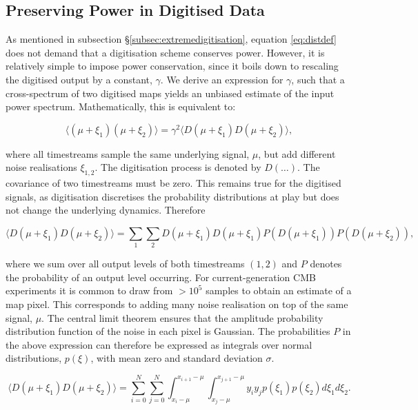 \documentclass[apj]{emulateapj}
\begin{document}
\subsection{Preserving Power in Digitised Data}
\label{subsec:appendixpreservepower}

As mentioned in subsection \S\ref{subsec:extremedigitisation}, equation \ref{eq:distdef} does not demand that a digitisation scheme conserves power. However, it is relatively simple to impose power conservation, since it boils down to rescaling the digitised output by a constant, $\gamma$. We derive an expression for $\gamma$, such that a cross-spectrum of two digitised maps yields an unbiased estimate of the input power spectrum. Mathematically, this is equivalent to:

\begin{equation} \label{eq:normcrosspower}
\langle (\mu + \xi_1) (\mu + \xi_2) \rangle = \gamma^2 \langle D(\mu + \xi_1) D(\mu + \xi_2) \rangle,
\end{equation}

where all timestreams sample the same underlying signal, $\mu$, but add different noise realisations $\xi_{1, 2}$. The digitisation process is denoted by $D(\dots)$. The covariance of two timestreams must be zero. This remains true for the digitised signals, as digitisation discretises the probability distributions at play but does not change the underlying dynamics. Therefore

\begin{equation}
\langle D(\mu + \xi_1) D(\mu + \xi_2) \rangle = \sum_1 \sum_2 D(\mu + \xi_1) D(\mu + \xi_1) P(D(\mu + \xi_1)) P(D(\mu + \xi_2)),
\end{equation}

where we sum over all output levels of both timestreams $(1, 2)$ and $P$ denotes the probability of an output level occurring. For current-generation CMB experiments it is common to draw from $>10^5$ samples to obtain an estimate of a map pixel. This corresponds to adding many noise realisation on top of the same signal, $\mu$. 
The central limit theorem ensures that the amplitude probability distribution function of the noise in each pixel is Gaussian. 
The probabilities $P$ in the above expression can therefore be expressed as integrals over normal distributions, $p(\xi)$, with mean zero and standard deviation $\sigma$.

\begin{equation}
\langle D(\mu + \xi_1) D(\mu + \xi_2) \rangle = \sum_{i=0}^N \sum_{j=0}^N  \int_{x_i-\mu}^{x_{i+1}-\mu} \int_{x_j-\mu}^{x_{j+1}-\mu} y_i y_j p(\xi_1) p(\xi_2) d\xi_1 d\xi_2.
\end{equation}
\end{document}
